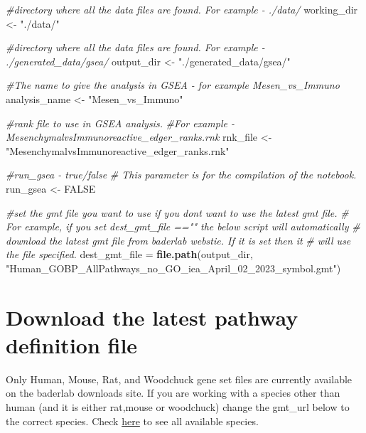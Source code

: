 \documentclass[
]{book}
\newenvironment{Shaded}{\begin{snugshade}}{\end{snugshade}}
\newcommand{\CommentTok}[1]{\textcolor[rgb]{0.56,0.35,0.01}{\textit{#1}}}
\newcommand{\ConstantTok}[1]{\textcolor[rgb]{0.56,0.35,0.01}{#1}}
\newcommand{\FunctionTok}[1]{\textcolor[rgb]{0.13,0.29,0.53}{\textbf{#1}}}
\newcommand{\NormalTok}[1]{#1}
\newcommand{\OtherTok}[1]{\textcolor[rgb]{0.56,0.35,0.01}{#1}}
\newcommand{\StringTok}[1]{\textcolor[rgb]{0.31,0.60,0.02}{#1}}
\begin{document}
\begin{Shaded}
\begin{Highlighting}[]
\CommentTok{\#directory where all the data files are found.  For example {-}   ./data/ }
\NormalTok{working\_dir }\OtherTok{\textless{}{-}} \StringTok{"./data/"}

\CommentTok{\#directory where all the data files are found.  For example {-}   ./generated\_data/gsea/}
\NormalTok{output\_dir }\OtherTok{\textless{}{-}} \StringTok{"./generated\_data/gsea/"}

\CommentTok{\#The name to give the analysis in GSEA {-} for example Mesen\_vs\_Immuno}
\NormalTok{analysis\_name }\OtherTok{\textless{}{-}} \StringTok{"Mesen\_vs\_Immuno"}

\CommentTok{\#rank file to use in GSEA analysis.  }
\CommentTok{\#For example {-} MesenchymalvsImmunoreactive\_edger\_ranks.rnk}
\NormalTok{rnk\_file }\OtherTok{\textless{}{-}} \StringTok{"MesenchymalvsImmunoreactive\_edger\_ranks.rnk"}

\CommentTok{\#run\_gsea {-} true/false}
\CommentTok{\# This parameter is for the compilation of the notebook.  }
\NormalTok{run\_gsea }\OtherTok{\textless{}{-}} \ConstantTok{FALSE}

\CommentTok{\#set the gmt file you want to use if you don\textquotesingle{}t want to use the latest gmt file.}
\CommentTok{\# For example, if you set dest\_gmt\_file =="" the below script will automatically}
\CommentTok{\# download the latest gmt file from baderlab webstie.  If it is set then it}
\CommentTok{\# will use the file specified.  }
\NormalTok{dest\_gmt\_file }\OtherTok{=} \FunctionTok{file.path}\NormalTok{(output\_dir, }
                          \StringTok{"Human\_GOBP\_AllPathways\_no\_GO\_iea\_April\_02\_2023\_symbol.gmt"}\NormalTok{)}
\end{Highlighting}
\end{Shaded}

\hypertarget{download-the-latest-pathway-definition-file}{%
\section{Download the latest pathway definition file}\label{download-the-latest-pathway-definition-file}}

Only Human, Mouse, Rat, and Woodchuck gene set files are currently available on the baderlab downloads site. If you are working with a species other than human (and it is either rat,mouse or woodchuck) change the gmt\_url below to the correct species. Check \href{http://download.baderlab.org/EM_Genesets/current_release/}{here} to see all available species.
\end{document}
